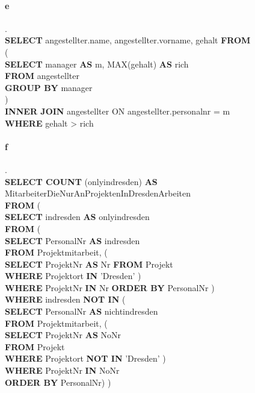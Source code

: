 \documentclass{article}
\begin{document}
		
		\paragraph*{e}.\\
			\textbf{SELECT} angestellter.name, angestellter.vorname, gehalt \textbf{FROM}\\
			(\\
			
			\textbf{SELECT} manager \textbf{AS} m, MAX(gehalt) \textbf{AS} rich\\
			
			\textbf{FROM} angestellter\\
			
			\textbf{GROUP BY} manager\\
			
			)\\
			\textbf{INNER JOIN} angestellter ON angestellter.personalnr = m\\
			\textbf{WHERE} gehalt > rich
			
			\pagebreak
		
		\paragraph*{f}.\\
			\textbf{SELECT COUNT} (onlyindresden) \textbf{AS} MitarbeiterDieNurAnProjektenInDresdenArbeiten\\ \textbf{FROM} (\\
			\textbf{SELECT} indresden \textbf{AS} onlyindresden\\ \textbf{FROM} (\\
			\textbf{SELECT} PersonalNr \textbf{AS} indresden\\ \textbf{FROM} Projektmitarbeit, (\\
			\textbf{SELECT} ProjektNr \textbf{AS} Nr \textbf{FROM} Projekt \\
			\textbf{WHERE} Projektort \textbf{IN} 'Dresden'
			)\\
			\textbf{WHERE} ProjektNr \textbf{IN} Nr \textbf{ORDER BY} PersonalNr
			)\\
			\textbf{WHERE} indresden \textbf{NOT IN} (\\
			\textbf{SELECT} PersonalNr \textbf{AS} nichtindresden\\ \textbf{FROM} Projektmitarbeit, (\\
			\textbf{SELECT} ProjektNr \textbf{AS} NoNr\\ 
			\textbf{FROM} Projekt\\ 
			\textbf{WHERE} Projektort \textbf{NOT IN} 'Dresden'
			)\\
			\textbf{WHERE} ProjektNr \textbf{IN} NoNr\\ \textbf{ORDER BY} PersonalNr)
			)	
		
\end{document}
